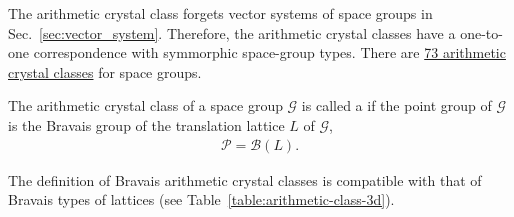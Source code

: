 The arithmetic crystal class forgets vector systems of space groups in Sec.~\ref{sec:vector_system}.
Therefore, the arithmetic crystal classes have a one-to-one correspondence with symmorphic space-group types.
There are \href{https://dictionary.iucr.org/Arithmetic_crystal_class}{73 arithmetic crystal classes} for space groups.

\begin{screen}
  \begin{defn}
    The arithmetic crystal class of a space group $\mathcal{G}$ is called a  if the point group of $\mathcal{G}$ is the Bravais group of the translation lattice $L$ of $\mathcal{G}$,
    \begin{align}
      \mathcal{P} = \mathcal{B}(L).
    \end{align}
  \end{defn}
\end{screen}

The definition of Bravais arithmetic crystal classes is compatible with that of Bravais types of lattices (see Table~\ref{table:arithmetic-class-3d}).

